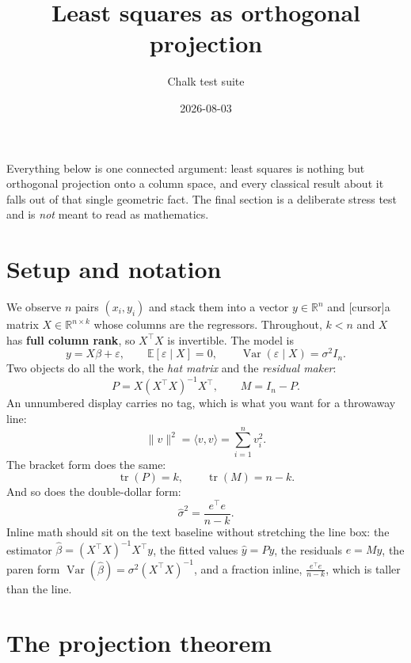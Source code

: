 \documentclass[11pt]{article}
\title{Least squares as orthogonal projection}
\author{Chalk test suite}
\date{2026-08-03}
\theoremstyle{definition}
\theoremstyle{remark}
\begin{document}
\maketitle

Everything below is one connected argument: least squares is nothing but
orthogonal projection onto a column space, and every classical result about it
falls out of that single geometric fact. The final section is a deliberate
stress test and is \emph{not} meant to read as mathematics.

\section{Setup and notation}
\label{sec:setup}

We observe $n$ pairs $(x_i, y_i)$ and stack them into a vector
$y \in \mathbb{R}^n$ and [cursor]a matrix $X \in \mathbb{R}^{n \times k}$ whose columns are the regressors. Throughout, $k < n$ and $X$ has \textbf{full column rank}, so $X^\top X$ is invertible. The model is
\begin{equation}
    y = X\beta + \varepsilon, \qquad \mathbb{E}[\varepsilon \mid X] = 0,
    \qquad \operatorname{Var}(\varepsilon \mid X) = \sigma^2 I_n .
    \label{eq:model}
\end{equation}
Two objects do all the work, the \emph{hat matrix} and the \emph{residual maker}:
\begin{equation}
    P = X(X^\top X)^{-1} X^\top, \qquad M = I_n - P .
    \label{eq:hat}
\end{equation}
An unnumbered display carries no tag, which is what you want for a throwaway line:
\begin{equation*}
    \|v\|^2 = \langle v, v \rangle = \sum_{i=1}^n v_i^2 .
\end{equation*}
The bracket form does the same:
\[
    \operatorname{tr}(P) = k, \qquad \operatorname{tr}(M) = n - k .
\]
And so does the double-dollar form:
$$
    \hat\sigma^2 = \frac{e^\top e}{n - k} .
$$
Inline math should sit on the text baseline without stretching the line box: the estimator $\hat\beta = (X^\top X)^{-1} X^\top y$, the fitted values $\hat y = Py$, the residuals $e = My$, the paren form \(\operatorname{Var}(\hat\beta) = \sigma^2 (X^\top X)^{-1}\), and a fraction inline, $\frac{e^\top e}{n-k}$, which is taller than the line.

\section{The projection theorem}
\label{sec:projection}
\end{document}
